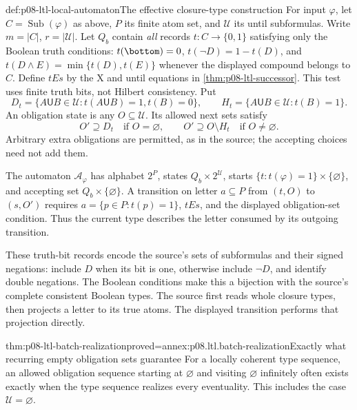 \begin{hbdefinition}{def:p08-ltl-local-automaton}{The effective closure-type construction}
For input \(\varphi\), let \(C=\operatorname{Sub}(\varphi)\)
as above, \(P\) its finite atom set, and \(\mathcal U\) its
until subformulas. Write \(m=|C|\), \(r=|\mathcal U|\).
Let \(Q_b\) contain \emph{all} records \(t:C\to\{0,1\}\)
satisfying only the Boolean truth conditions:
\(t(\bottom)=0\), \(t(\neg D)=1-t(D)\), and
\(t(D\land E)=\min\{t(D),t(E)\}\) whenever the displayed
compound belongs to \(C\). Define \(tEs\)
by the X and until equations in
\cref{thm:p08-ltl-successor}. This test uses finite truth bits,
not Hilbert consistency. Put
\[
 D_t=\{A\mathbin{\mathsf U}B\in\mathcal U:
                 t(A\mathbin{\mathsf U}B)=1, t(B)=0\},
 \qquad H_t=\{A\mathbin{\mathsf U}B\in\mathcal U:t(B)=1\}.
\]
An obligation state is any \(O\subseteq\mathcal U\).
Its allowed next sets satisfy
\[
 O'\supseteq D_t\quad\text{if }O=\varnothing,
 \qquad O'\supseteq O\setminus H_t\quad\text{if }O\ne\varnothing.
\]
Arbitrary extra obligations are permitted, as in the source;
the accepting choices need not add them.

The automaton \(\mathcal A_\varphi\) has alphabet
\(2^P\), states \(Q_b\times2^{\mathcal U}\), starts
\(\{t:t(\varphi)=1\}\times\{\varnothing\}\), and accepting
set \(Q_b\times\{\varnothing\}\). A transition on letter
\(a\subseteq P\) from \((t,O)\) to \((s,O')\) requires
\(a=\{p\in P:t(p)=1\}\), \(tEs\), and the displayed
obligation-set condition. Thus the current type describes the
letter consumed by its outgoing transition.
\cite[preprint Appendix B, pp.~2--3]{VardiWolper1985LTLPreprint}
\end{hbdefinition}

These truth-bit records encode the source's sets of subformulas
and their signed negations: include \(D\) when its bit is one,
otherwise include \(\neg D\), and identify double negations.
The Boolean conditions make this a bijection with the source's
complete consistent Boolean types. The source first reads whole
closure types, then projects a letter to its true atoms. The
displayed transition performs that projection directly.

\begin{hblemma}{thm:p08-ltl-batch-realization}{proved=annex:p08.ltl.batch-realization}{Exactly what recurring empty obligation sets guarantee}
For a locally coherent type sequence, an allowed obligation
sequence starting at \(\varnothing\) and visiting
\(\varnothing\) infinitely often exists exactly when the type
sequence realizes every eventuality. This includes the case
\(\mathcal U=\varnothing\).
\end{hblemma}

